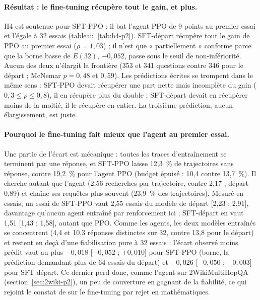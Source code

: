 \documentclass[11pt,a4paper]{article}
\begin{document}
\paragraph{Résultat : le fine-tuning récupère tout le gain, et plus.} H4 est soutenue pour SFT-PPO : il bat l'agent PPO de 9 points au premier essai et l'égale à 32 essais (tableau~\ref{tab:h4-p2}). SFT-départ récupère tout le gain de PPO au premier essai ($\rho = 1{,}03$) ; il n'est que « partiellement » conforme parce que la borne basse de $E(32)$, $-0{,}052$, passe sous le seuil de non-infériorité. Aucun des deux n'élargit la frontière (353 et 341 questions contre 346 pour le départ ; McNemar $p = 0{,}48$ et $0{,}59$). Les prédictions écrites se trompent dans le même sens : SFT-PPO devait récupérer une part nette mais incomplète du gain ($0{,}3 \le \rho \le 0{,}8$), il en récupère plus du double ; SFT-départ devait en récupérer moins de la moitié, il le récupère en entier. La troisième prédiction, aucun élargissement, est juste.

\paragraph{Pourquoi le fine-tuning fait mieux que l'agent au premier essai.} Une partie de l'écart est mécanique : toutes les traces d'entraînement se terminent par une réponse, et SFT-PPO laisse 12,3~\% de trajectoires sans réponse, contre 19,2~\% pour l'agent PPO (budget épuisé : 10,4 contre 13,7~\%). Il cherche autant que l'agent (2,56 recherches par trajectoire, contre 2,17 ; départ 0,89) et chaîne ses requêtes plus souvent (23,9~\% des trajectoires). Mesuré en essais, un essai de SFT-PPO vaut 2,55 essais du modèle de départ [2,23 ; 2,91], davantage qu'aucun agent entraîné par renforcement ici ; SFT-départ en vaut 1,51 [1,43 ; 1,58], autant que PPO. Comme les agents, les deux modèles entraînés se concentrent (4,4 et 10,3 réponses distinctes sur 32, contre 13,8 pour le départ) et restent en deçà d'une fiabilisation pure à 32 essais : l'écart observé moins prédit vaut au plus $-0{,}018$ [$-0{,}052$ ; $+0{,}010$] pour SFT-PPO (borne, la prédiction demandant plus de 64 essais du départ) et $-0{,}026$ [$-0{,}050$ ; $-0{,}003$] pour SFT-départ. Ce dernier perd donc, comme l'agent sur 2WikiMultiHopQA (section~\ref{sec:2wiki-p2}), un peu de couverture en gagnant de la fiabilité, ce qui rejoint le constat de \citet{rath2026passk} sur le fine-tuning par rejet en mathématiques.
\end{document}
